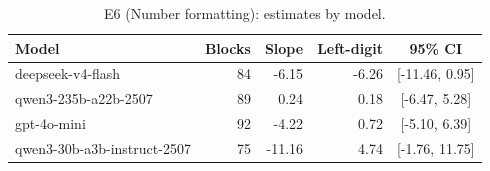 \begin{table}[t]
\centering
\caption{E6 (Number formatting): estimates by model.}
\label{tab:e6model}
\small
\begin{tabular}{lrrrc}
\toprule
Model & Blocks & Slope & Left-digit & 95\% CI \\
\midrule
deepseek-v4-flash & 84 & -6.15 & -6.26 & [-11.46, 0.95] \\
qwen3-235b-a22b-2507 & 89 & 0.24 & 0.18 & [-6.47, 5.28] \\
gpt-4o-mini & 92 & -4.22 & 0.72 & [-5.10, 6.39] \\
qwen3-30b-a3b-instruct-2507 & 75 & -11.16 & 4.74 & [-1.76, 11.75] \\
\bottomrule
\end{tabular}
\end{table}
